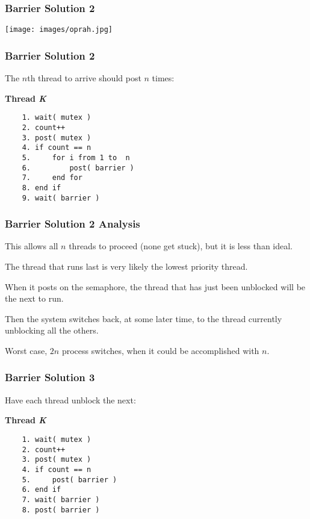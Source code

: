 \begin{frame}
	\frametitle{Barrier Solution 2}

	\begin{center}
		\texttt{[image: images/oprah.jpg]}
	\end{center}


\end{frame}


\begin{frame}[fragile]
	\frametitle{Barrier Solution 2}

	The $n$th thread to arrive should post $n$ times:

	\textbf{Thread \textit{K}}\vspace{-6em}
	\begin{verbatim}
	1. wait( mutex )
	2. count++
	3. post( mutex )
	4. if count == n
	5.     for i from 1 to  n
	6.         post( barrier )
	7.     end for
	8. end if
	9. wait( barrier )
  \end{verbatim}
	\vspace{-2em}




\end{frame}

\begin{frame}
	\frametitle{Barrier Solution 2 Analysis}

	This allows all $n$ threads to proceed (none get stuck), but it is less than ideal.

	The thread that runs last is very likely the lowest priority thread.

	When it posts on the semaphore, the thread that has just been unblocked will be the next to run.

	Then the system switches back, at some later time, to the thread currently unblocking all the others.

	Worst case, $2n$ process switches, when it could be accomplished with $n$.


\end{frame}

\begin{frame}[fragile]
	\frametitle{Barrier Solution 3}

	Have each thread unblock the next:

	\textbf{Thread \textit{K}}\vspace{-6em}
	\begin{verbatim}
	1. wait( mutex )
	2. count++
	3. post( mutex )
	4. if count == n
	5.     post( barrier )
	6. end if
	7. wait( barrier )
	8. post( barrier )
  \end{verbatim}
	\vspace{-2em}


\end{frame}


